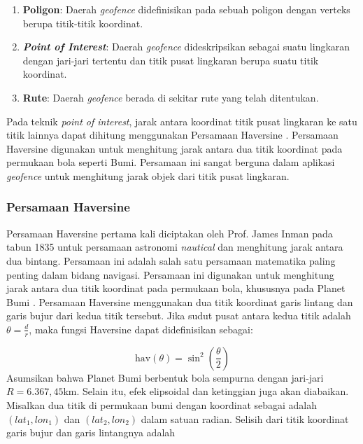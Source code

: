 \begin{enumerate}
	\item \textbf{Poligon}: Daerah \textit{geofence} didefinisikan pada sebuah poligon dengan verteks berupa titik-titik koordinat.
	\item \textbf{\textit{Point of Interest}}: Daerah \textit{geofence} dideskripsikan sebagai suatu lingkaran dengan jari-jari tertentu dan titik pusat lingkaran berupa suatu titik koordinat.
	\item \textbf{Rute}: Daerah \textit{geofence} berada di sekitar rute yang telah ditentukan.
\end{enumerate}

Pada teknik \textit{point of interest}, jarak antara koordinat titik pusat lingkaran ke satu titik lainnya dapat dihitung menggunakan Persamaan Haversine  \cite{Pratama2020}. Persamaan Haversine digunakan untuk menghitung jarak antara dua titik koordinat pada permukaan bola seperti Bumi. Persamaan ini sangat berguna dalam aplikasi \textit{geofence} untuk menghitung jarak objek dari titik pusat lingkaran.

\subsubsection{Persamaan Haversine}
Persamaan Haversine pertama kali diciptakan oleh Prof. James Inman pada tabun 1835 untuk persamaan astronomi \textit{nautical} dan menghitung jarak antara dua bintang. Persamaan ini adalah salah satu persamaan matematika paling penting dalam bidang navigasi. Persamaan ini digunakan untuk menghitung jarak antara dua titik koordinat pada permukaan bola, khususnya pada Planet Bumi \cite{Hofmann-Wellenhof2008,Feng2013}. Persamaan Haversine menggunakan dua titik koordinat garis lintang dan garis bujur dari kedua titik tersebut. Jika sudut pusat antara kedua titik adalah $\theta = \frac{d}{r}$, maka fungsi Haversine dapat didefinisikan sebagai:

\begin{equation}
	\text{hav}(\theta) = \sin^2{\left(\frac{\theta}{2}\right)}
	\label{eq:haversine}
\end{equation}
Asumsikan bahwa Planet Bumi berbentuk bola sempurna dengan jari-jari $R=6.367,45$km. Selain itu, efek elipsoidal dan ketinggian juga akan diabaikan. Misalkan dua titik di permukaan bumi dengan koordinat sebagai adalah $(lat_1, lon_1)$ dan $(lat_2, lon_2)$ dalam satuan radian. Selisih dari titik koordinat garis bujur dan garis lintangnya adalah

